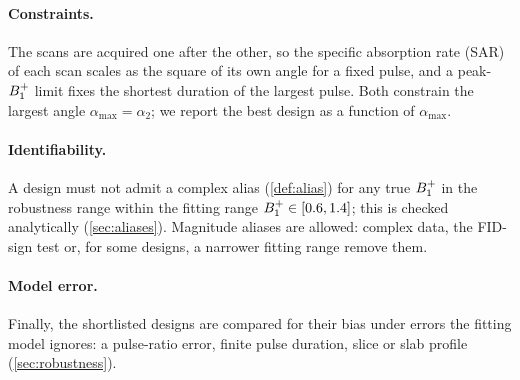 \paragraph{Constraints.} The scans are acquired one after the other, so the specific absorption
rate (SAR) of each scan scales as the square of its own angle for a fixed pulse, and a
peak-$B_1^{+}$ limit fixes the shortest duration of the largest pulse. Both constrain the largest
angle $\alpha_{\max}=\alpha_2$; we report the best design as a function of $\alpha_{\max}$.

\paragraph{Identifiability.} A design must not admit a complex alias (\cref{def:alias}) for any true
$B_1^{+}$ in the robustness range within the fitting range $B_1^{+}\in[0.6,1.4]$; this is checked analytically
(\cref{sec:aliases}). Magnitude aliases are allowed: complex data, the FID-sign test or, for some
designs, a narrower fitting range remove them.

\paragraph{Model error.} Finally, the shortlisted designs are compared for their bias under
errors the fitting model ignores: a pulse-ratio error, finite pulse duration, slice or slab
profile (\cref{sec:robustness}).
